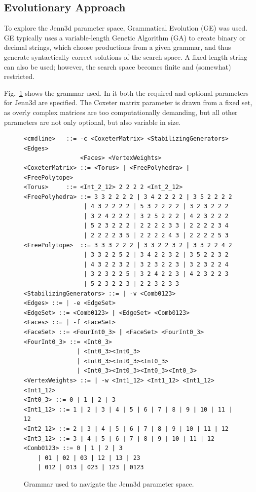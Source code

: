 \documentclass{article}
\begin{document}
\subsection{Evolutionary Approach}

To explore the Jenn3d parameter space, Grammatical Evolution (GE)
\cite{oneill03b} was used. GE typically uses a variable-length Genetic
Algorithm (GA) \cite{holland75} to create binary or decimal strings, which
choose productions from a given grammar, and thus generate syntactically
correct solutions of the search space. A fixed-length string can also be used;
however, the search space becomes finite and (somewhat) restricted.

Fig.~\ref{grammar} shows the grammar used. In it both the required and optional
parameters for Jenn3d are specified. The Coxeter matrix parameter is drawn from
a fixed set, as overly complex matrices are too computationally demanding, but
all other parameters are not only optional, but also variable in size.

\begin{figure}[h!t]
	\begin{verbatim}
<cmdline>	::= -c <CoxeterMatrix> <StabilizingGenerators> <Edges>
                <Faces> <VertexWeights>
<CoxeterMatrix>	::= <Torus> | <FreePolyhedra> | <FreePolytope>
<Torus>		::= <Int_2_12> 2 2 2 2 <Int_2_12>
<FreePolyhedra>	::= 3 3 2 2 2 2 | 3 4 2 2 2 2 | 3 5 2 2 2 2
                 | 4 3 2 2 2 2 | 5 3 2 2 2 2 | 3 2 3 2 2 2
                 | 3 2 4 2 2 2 | 3 2 5 2 2 2 | 4 2 3 2 2 2
                 | 5 2 3 2 2 2 | 2 2 2 2 3 3 | 2 2 2 2 3 4
                 | 2 2 2 2 3 5 | 2 2 2 2 4 3 | 2 2 2 2 5 3
<FreePolytope>	::= 3 3 3 2 2 2 | 3 3 2 2 3 2 | 3 3 2 2 4 2
                 | 3 3 2 2 5 2 | 3 4 2 2 3 2 | 3 5 2 2 3 2
                 | 4 3 2 2 3 2 | 3 2 3 2 2 3 | 3 2 3 2 2 4
                 | 3 2 3 2 2 5 | 3 2 4 2 2 3 | 4 2 3 2 2 3
                 | 5 2 3 2 2 3 | 2 2 3 2 3 3
<StabilizingGenerators> ::= | -v <Comb0123>
<Edges> ::= | -e <EdgeSet>
<EdgeSet> ::= <Comb0123> | <EdgeSet> <Comb0123>
<Faces> ::= | -f <FaceSet>
<FaceSet> ::= <FourInt0_3> | <FaceSet> <FourInt0_3>
<FourInt0_3> ::= <Int0_3>
               | <Int0_3><Int0_3>
               | <Int0_3><Int0_3><Int0_3>
               | <Int0_3><Int0_3><Int0_3><Int0_3>
<VertexWeights> ::= | -w <Int1_12> <Int1_12> <Int1_12> <Int1_12>
<Int0_3> ::= 0 | 1 | 2 | 3
<Int1_12> ::= 1 | 2 | 3 | 4 | 5 | 6 | 7 | 8 | 9 | 10 | 11 | 12
<Int2_12> ::= 2 | 3 | 4 | 5 | 6 | 7 | 8 | 9 | 10 | 11 | 12
<Int3_12> ::= 3 | 4 | 5 | 6 | 7 | 8 | 9 | 10 | 11 | 12
<Comb0123> ::= 0 | 1 | 2 | 3
	| 01 | 02 | 03 | 12 | 13 | 23
	| 012 | 013 | 023 | 123 | 0123
	\end{verbatim}
	\caption{Grammar used to navigate the Jenn3d parameter space.}
	\label{grammar}
\end{figure}
\end{document}
